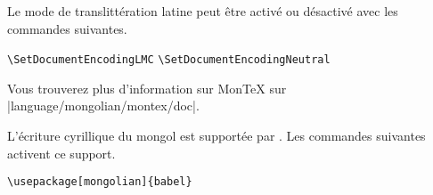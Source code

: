 Le mode de translittération latine peut être activé ou désactivé avec les
commandes suivantes.
\begin{lscommand}
\verb|\SetDocumentEncodingLMC|
\verb|\SetDocumentEncodingNeutral|
\end{lscommand}

Vous trouverez plus d'information sur Mon\TeX{} sur
\CTAN|language/mongolian/montex/doc|.

L'écriture cyrillique du mongol est supportée par . Les commandes
suivantes activent ce support.

\begin{lscommand}
\verb|\usepackage[mongolian]{babel}|
\end{lscommand}
